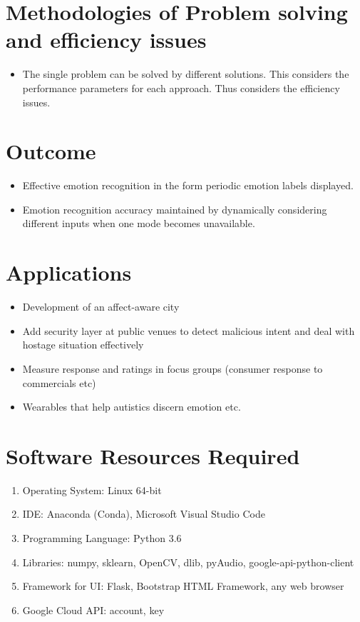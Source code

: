 \documentclass[oneside,a4paper,12pt]{report}
\begin{document}
\begin{normalsize}
\begin{itemize}
\end{itemize}
\vspace{4mm}
\section{Methodologies of Problem solving and efficiency issues}
\begin{itemize}
	\item The single problem can be solved by different solutions.  This considers the performance parameters for each approach. Thus considers the efficiency issues.
\end{itemize}
\vspace{4mm}
\section{Outcome}
\begin{itemize}
\item Effective emotion recognition in the form periodic emotion labels displayed.
\item Emotion recognition accuracy maintained by dynamically considering different inputs when one mode becomes unavailable.

\end{itemize}
\vspace{4mm}
\section{Applications}
\begin{itemize}
\item Development of an affect-aware city
\item Add security layer at public venues to detect malicious intent and deal with hostage situation effectively
\item Measure response and ratings in focus groups (consumer response to commercials etc)
\item Wearables that help autistics discern emotion etc.
\end{itemize}
\vspace{4mm}
\section{Software Resources Required}
\begin{enumerate}
	\item Operating System: Linux 64-bit
	\item IDE: Anaconda (Conda), Microsoft Visual Studio Code
	\item Programming Language: Python 3.6
	\item Libraries: numpy, sklearn, OpenCV, dlib, pyAudio, google-api-python-client
	\item Framework for UI: Flask, Bootstrap HTML Framework, any web browser
	\item Google Cloud API: account, key
\end{enumerate}
\vspace{10mm}

\end{normalsize}
\end{document}
